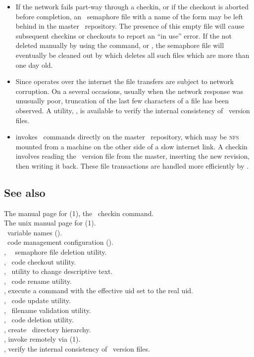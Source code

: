 \begin{itemize}
\item
   If the network fails part-way through a checkin, or if the checkout is
   aborted before completion, an \rcs\ semaphore file with a name of the form
   \file{,*,} may be left behind in the master \rcs\ repository.  The presence
   of this empty file will cause subsequent checkins or checkouts to report an
   ``in use'' error.  If the not deleted manually by using the 
   command, or , the semaphore file will eventually be cleaned out
   by  which deletes all such files which are more
   than one day old.

\item
   Since  operates over the internet the file transfers are subject to
   network corruption.  On a several occasions, usually when the network
   response was unusually poor, truncation of the last few characters of a
   file has been observed.  A utility, , is available
   to verify the internal consistency of \rcs\ version files.

\item
    invokes \rcs\ commands directly on the master \rcs\ repository,
   which may be \textsc{nfs} mounted from a machine on the other side of a
   slow internet link.  A checkin involves reading the \rcs\ version file from
   the master, inserting the new revision, then writing it back.  These file
   transactions are handled more efficiently by .
\end{itemize}

\subsection*{See also}

The manual page for (1), the \rcs\ checkin command.\\
The unix manual page for (1).\\
\aipspp\ variable names ().\\
\aipspp\ code management configuration ().\\
, \aipspp\ \rcs\ semaphore file deletion utility.\\
, \aipspp\ code checkout utility.\\
, \aipspp\ utility to change descriptive text.\\
, \aipspp\ code rename utility.\\
, execute a command with the effective uid set to the real uid.\\
, \aipspp\ code update utility.\\
, \aipspp\ filename validation utility.\\
, \aipspp\ code deletion utility.\\
, create \aipspp\ directory hierarchy.\\
, invoke  remotely via (1).\\
, verify the internal consistency of \rcs\ version files.

